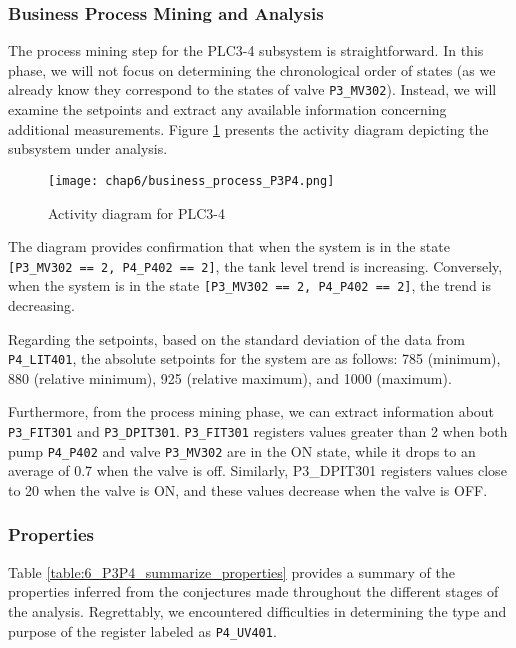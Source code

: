 \subsubsection{Business Process Mining and Analysis}
\label{subsubsec:6_P3P4_bpa}

The process mining step for the PLC3-4 subsystem is straightforward. In this phase, we will not focus on determining the chronological order of states (as we already know they correspond to the states of valve \texttt{P3\_MV302}). Instead, we will examine the setpoints and extract any available information concerning additional measurements.
Figure \ref{fig:6_P3P4_process_mining} presents the activity diagram depicting the subsystem under analysis.

\begin{figure}[ht]
	\centering
	\texttt{[image: chap6/business\_process\_P3P4.png]}
	\caption{Activity diagram for PLC3-4}
	\label{fig:6_P3P4_process_mining}
\end{figure}

\bigskip
The diagram provides confirmation that when the system is in the state \texttt{[P3\_MV302 == 2, P4\_P402 == 2]}, the tank level trend is increasing. Conversely, when the system is in the state \texttt{[P3\_MV302 == 2, P4\_P402 == 2]}, the trend is decreasing.

\bigskip
Regarding the setpoints, based on the standard deviation of the data from \texttt{P4\_LIT401}, the absolute setpoints for the system are as follows: 785 (minimum), 880 (relative minimum), 925 (relative maximum), and 1000 (maximum).

\bigskip
Furthermore, from the process mining phase, we can extract information about \texttt{P3\_FIT301} and \texttt{P3\_DPIT301}. \texttt{P3\_FIT301} registers values greater than 2 when both pump \texttt{P4\_P402} and valve \texttt{P3\_MV302} are in the ON state, while it drops to an average of 0.7 when the valve is off. Similarly, P3\_DPIT301 registers values close to 20 when the valve is ON, and these values decrease when the valve is OFF.

\subsubsection{Properties}
\label{subsubsec:6_P3P4_summary_table}

Table \ref{table:6_P3P4_summarize_properties} provides a summary of the properties inferred from the conjectures made throughout the different stages of the analysis. Regrettably, we encountered difficulties in determining the type and purpose of the register labeled as \texttt{P4\_UV401}.

